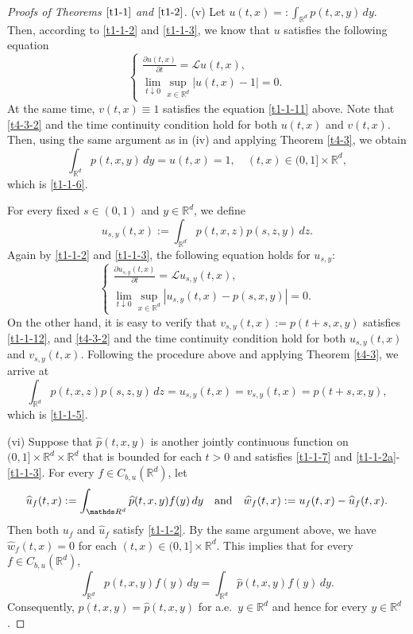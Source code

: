 \documentclass[a4paper,11pt]{amsart}
\newcommand{\R}{\mathds R}
\def\LL{{\mathcal L}}
\def\wh{\widehat}
\theoremstyle{definition}
\begin{document}
\begin{proof}[Proofs of Theorems $\ref{t1-1}$ and $\ref{t1-2}$]
\smallskip

(v) Let $u(t,x)=:\int_{\R^d}p(t,x,y)\,dy$. Then, according to \eqref{t1-1-2} and \eqref{t1-1-3}, we know that
$u$ satisfies the following equation
\begin{equation}\label{t1-1-11}
\begin{cases}
\frac{\partial u(t,x)}{\partial t}= \LL u(t,x),\\
\lim_{t \downarrow 0}\sup_{x \in \R^d}\big|u(t,x)-1\big|=0.
\end{cases}
\end{equation}
At the same time, $v(t,x)\equiv 1$ satisfies the equation \eqref{t1-1-11} above. Note that \eqref{t4-3-2} and the time continuity condition hold for both
$u(t,x)$ and $v(t,x)$. Then, using the same argument as in (iv)  and applying Theorem \ref{t4-3}, we obtain
\begin{equation*}
\int_{\R^d}p(t,x,y)\,dy=u(t,x)=1,\quad (t,x)\in (0,1]\times \R^d,
\end{equation*}
which is \eqref{t1-1-6}.

For every fixed $s \in (0,1)$ and $y \in \R^d$, we define $$u_{s,y}(t,x):=\int_{\R^d}p(t,x,z)p(s,z,y)\,dz.$$
 Again by \eqref{t1-1-2} and \eqref{t1-1-3}, the following equation holds for $u_{s,y}$:
\begin{equation}\label{t1-1-12}
\begin{cases}
\frac{\partial u_{s,y}(t,x)}{\partial t}= \LL u_{s,y}(t,x),\\
\lim_{t \downarrow 0}\sup_{x \in \R^d}|u_{s,y}(t,x)-p(s,x,y)|=0.
\end{cases}
\end{equation}
On the other hand, it is easy to verify that $v_{s,y}(t,x):=p(t+s,x,y)$ satisfies
\eqref{t1-1-12}, and \eqref{t4-3-2} and the time continuity condition hold for both
$u_{s,y}(t,x)$ and $v_{s,y}(t,x)$.  Following the procedure above and applying Theorem \ref{t4-3}, we arrive at
$$\int_{\R^d}p(t,x,z)p(s,z,y)\,dz=u_{s,y}(t,x)=v_{s,y}(t,x)=p(t+s,x,y),$$
which is \eqref{t1-1-5}.

\smallskip

(vi)
Suppose that $\wh p(t,x,y)$ is another
jointly continuous function  on $(0, 1]\times \R^d\times \R^d$
that is bounded for each $t>0$ and
 satisfies  \eqref{t1-1-7} and \eqref{t1-1-2a}-\eqref{t1-1-3}.
For every $f \in C_{b,u}(\R^d)$, let
$$\wh u_f(t,x):=\int_{\R^d}\wh p(t,x,y)f(y)\,dy \quad \hbox{and} \quad
\wh w_f(t,x):=u_f(t,x)-\wh u_f(t,x).
$$
 Then both $u_f$ and $\wh u_f$ satisfy \eqref{t1-1-2}. By the same argument above, we have
$\wh w_f(t,x)=0$ for each $(t,x)\in (0,1]\times \R^d$. This implies
that for every $f \in C_{b,u}(\R^d)$,
\begin{equation*}
\int_{\R^d} p(t,x,y)f(y)\,dy=\int_{\R^d} \wh p(t,x,y)f(y)\,dy.
\end{equation*}
Consequently, $p(t,x,y)=\wh p(t,x,y)$ for a.e.\ $y \in \R^d$ and hence for every $y\in \R^d$.


\end{proof}
\end{document}

